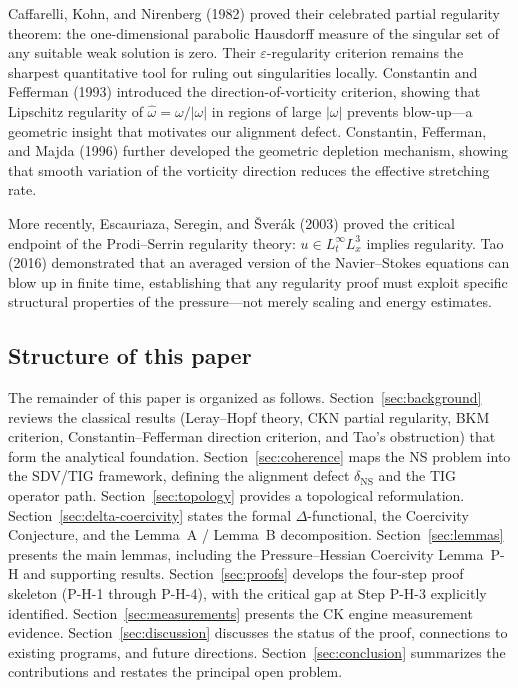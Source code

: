 \documentclass[11pt]{article}
\theoremstyle{definition}
\theoremstyle{remark}
\newcommand{\eps}{\varepsilon}
\begin{document}
Caffarelli, Kohn, and Nirenberg \cite{CKN} (1982) proved their celebrated partial
regularity theorem: the one-dimensional parabolic Hausdorff measure of the singular
set of any suitable weak solution is zero.  Their $\eps$-regularity criterion
remains the sharpest quantitative tool for ruling out singularities locally.
Constantin and Fefferman \cite{CF} (1993) introduced the direction-of-vorticity
criterion, showing that Lipschitz regularity of $\hat\omega = \omega/|\omega|$ in
regions of large $|\omega|$ prevents blow-up---a geometric insight that motivates
our alignment defect.  Constantin, Fefferman, and Majda \cite{CF2} (1996) further
developed the geometric depletion mechanism, showing that smooth variation of the
vorticity direction reduces the effective stretching rate.

More recently, Escauriaza, Seregin, and \v{S}ver\'ak \cite{ESS} (2003)
proved the critical endpoint of the Prodi--Serrin regularity theory:
$u \in L^\infty_t L^3_x$ implies regularity.  Tao \cite{Tao} (2016) demonstrated
that an averaged version of the Navier--Stokes equations can blow up in finite time,
establishing that any regularity proof must exploit specific structural properties
of the pressure---not merely scaling and energy estimates.

\subsection{Structure of this paper}

The remainder of this paper is organized as follows.
Section~\ref{sec:background} reviews the classical results (Leray--Hopf theory,
CKN partial regularity, BKM criterion, Constantin--Fefferman direction criterion,
and Tao's obstruction) that form the analytical foundation.
Section~\ref{sec:coherence} maps the NS problem into the SDV/TIG framework,
defining the alignment defect $\delta_{\mathrm{NS}}$ and the TIG operator path.
Section~\ref{sec:topology} provides a topological reformulation.
Section~\ref{sec:delta-coercivity} states the formal $\Delta$-functional,
the Coercivity Conjecture, and the Lemma~A / Lemma~B decomposition.
Section~\ref{sec:lemmas} presents the main lemmas, including the Pressure--Hessian
Coercivity Lemma~P-H and supporting results.
Section~\ref{sec:proofs} develops the four-step proof skeleton (P-H-1 through
P-H-4), with the critical gap at Step P-H-3 explicitly identified.
Section~\ref{sec:measurements} presents the CK engine measurement evidence.
Section~\ref{sec:discussion} discusses the status of the proof, connections to
existing programs, and future directions.
Section~\ref{sec:conclusion} summarizes the contributions and restates the
principal open problem.
\end{document}
